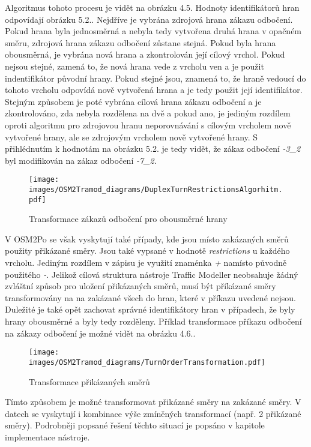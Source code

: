 Algoritmus tohoto procesu je vidět na obrázku 4.5. Hodnoty identifikátorů hran odpovídají obrázku 5.2.. Nejdříve je vybrána zdrojová hrana zákazu odbočení. Pokud hrana byla jednosměrná a nebyla tedy vytvořena druhá hrana v opačném směru, zdrojová hrana zákazu odbočení zůstane stejná. Pokud byla hrana obousměrná, je vybrána nová hrana a zkontrolován její cílový vrchol. Pokud nejsou stejné, zamená to, že nová hrana vede z vrcholu ven a je použit indentifikátor původní hrany. Pokud stejné jsou, znamená to, že hraně vedoucí do tohoto vrcholu odpovídá nově vytvořená hrana a je tedy použit její identifikátor. Stejným způsobem je poté vybrána cílová hrana zákazu odbočení a je zkontrolováno, zda nebyla rozdělena na dvě a pokud ano, je jediným rozdílem oproti algoritmu pro zdrojovou hranu neporovnávání s cílovým vrcholem nově vytvořené hrany, ale se zdrojovým vrcholem nově vytvořené hrany. S přihlédnutím k hodnotám na obrázku 5.2. je tedy vidět, že zákaz odbočení \textit{-3\_2} byl modifikován na zákaz odbočení \textit{-7\_2}.

\begin{figure}[htbp]
\centering
\texttt{[image: images/OSM2Tramod\_diagrams/DuplexTurnRestrictionsAlgorhitm.pdf]}
\caption{Transformace zákazů odbočení pro obousměrné hrany}
\end{figure}
\vspace{10pt}

V OSM2Po se však vyskytují také případy, kde jsou místo zakázaných směrů použity přikázané směry. Jsou také vypsané v hodnotě \textit{restrictions} u každého vrcholu. Jediným rozdílem v zápisu je využití znaménka \textit{+} namísto původně použitého \textit{-}. Jelikož cílová struktura nástroje Traffic Modeller neobsahuje žádný zvláštní způsob pro uložení přikázaných směrů, musí být příkázané směry transformovány na na zakázané všech do hran, které v příkazu uvedené nejsou. Duležité je také opět zachovat správné identifikátory hran v případech, že byly hrany obousměrné a byly tedy rozděleny. Příklad transformace příkazu odbočení na zákazy odbočení je možné vidět na obrázku 4.6.. 

\begin{figure}[htbp]
\centering
\texttt{[image: images/OSM2Tramod\_diagrams/TurnOrderTransformation.pdf]}
\caption{Transformace přikázaných směrů}
\end{figure}
\vspace{10pt}

Tímto způsobem je možné transformovat přikázané směry na zakázané směry. V datech se vyskytují i kombinace výše zmíněných transformací (např. 2 přikázané směry). Podrobněji popsané řešení těchto situací je popsáno v kapitole implementace nástroje. 

